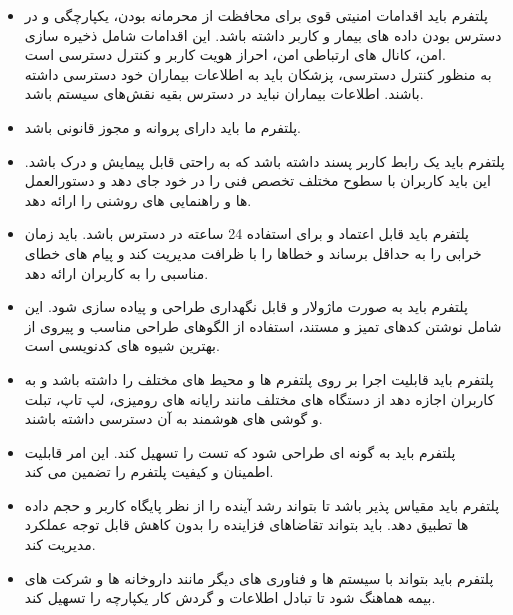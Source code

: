 \documentclass[a4paper]{article}
\begin{document}
	\begin{itemize}
						
		\item پلتفرم باید اقدامات امنیتی قوی برای محافظت از محرمانه بودن، یکپارچگی و در دسترس بودن داده های بیمار و کاربر داشته باشد. این اقدامات شامل ذخیره سازی امن، کانال های ارتباطی امن، احراز هویت کاربر و کنترل دسترسی است.\\
		به منظور کنترل دسترسی، پزشکان باید به اطلاعات بیماران خود دسترسی داشته باشند. اطلاعات بیماران نباید در دسترس بقیه نقش‌های سیستم باشد.
		
		\item پلتفرم ما باید دارای پروانه و مجوز قانونی باشد.
		
		\item پلتفرم باید یک رابط کاربر پسند داشته باشد که به راحتی قابل پیمایش و درک باشد. این باید کاربران با سطوح مختلف تخصص فنی را در خود جای دهد و دستورالعمل ها و راهنمایی های روشنی را ارائه دهد.
		
		\item پلتفرم باید قابل اعتماد و برای استفاده 24 ساعته در دسترس باشد. باید زمان خرابی را به حداقل برساند و خطاها را با ظرافت مدیریت کند و پیام های خطای مناسبی را به کاربران ارائه دهد.
		
		\item پلتفرم باید به صورت ماژولار و قابل نگهداری طراحی و پیاده سازی شود. این شامل نوشتن کدهای تمیز و مستند، استفاده از الگوهای طراحی مناسب و پیروی از بهترین شیوه های کدنویسی است.
		
		\item پلتفرم باید قابلیت اجرا بر روی پلتفرم ها و محیط های مختلف را داشته باشد و به کاربران اجازه دهد از دستگاه های مختلف مانند رایانه های رومیزی، لپ تاپ، تبلت و گوشی های هوشمند به آن دسترسی داشته باشند.
		
		\item پلتفرم باید به گونه ای طراحی شود که تست را تسهیل کند. این امر قابلیت اطمینان و کیفیت پلتفرم را تضمین می کند.
		
		\item پلتفرم باید مقیاس پذیر باشد تا بتواند رشد آینده را از نظر پایگاه کاربر و حجم داده ها تطبیق دهد. باید بتواند تقاضاهای فزاینده را بدون کاهش قابل توجه عملکرد مدیریت کند.
		
		\item پلتفرم باید بتواند با سیستم ها و فناوری های دیگر مانند داروخانه ها و شرکت های بیمه هماهنگ شود تا تبادل اطلاعات و گردش کار یکپارچه را تسهیل کند.
		
	\end{itemize}
\end{document}
